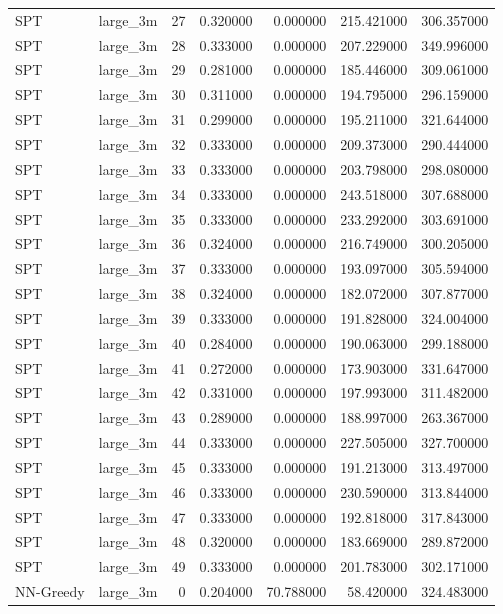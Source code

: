 \begin{tabular}{llrrrrr}
SPT & large_3m & 27 & 0.320000 & 0.000000 & 215.421000 & 306.357000 \\
SPT & large_3m & 28 & 0.333000 & 0.000000 & 207.229000 & 349.996000 \\
SPT & large_3m & 29 & 0.281000 & 0.000000 & 185.446000 & 309.061000 \\
SPT & large_3m & 30 & 0.311000 & 0.000000 & 194.795000 & 296.159000 \\
SPT & large_3m & 31 & 0.299000 & 0.000000 & 195.211000 & 321.644000 \\
SPT & large_3m & 32 & 0.333000 & 0.000000 & 209.373000 & 290.444000 \\
SPT & large_3m & 33 & 0.333000 & 0.000000 & 203.798000 & 298.080000 \\
SPT & large_3m & 34 & 0.333000 & 0.000000 & 243.518000 & 307.688000 \\
SPT & large_3m & 35 & 0.333000 & 0.000000 & 233.292000 & 303.691000 \\
SPT & large_3m & 36 & 0.324000 & 0.000000 & 216.749000 & 300.205000 \\
SPT & large_3m & 37 & 0.333000 & 0.000000 & 193.097000 & 305.594000 \\
SPT & large_3m & 38 & 0.324000 & 0.000000 & 182.072000 & 307.877000 \\
SPT & large_3m & 39 & 0.333000 & 0.000000 & 191.828000 & 324.004000 \\
SPT & large_3m & 40 & 0.284000 & 0.000000 & 190.063000 & 299.188000 \\
SPT & large_3m & 41 & 0.272000 & 0.000000 & 173.903000 & 331.647000 \\
SPT & large_3m & 42 & 0.331000 & 0.000000 & 197.993000 & 311.482000 \\
SPT & large_3m & 43 & 0.289000 & 0.000000 & 188.997000 & 263.367000 \\
SPT & large_3m & 44 & 0.333000 & 0.000000 & 227.505000 & 327.700000 \\
SPT & large_3m & 45 & 0.333000 & 0.000000 & 191.213000 & 313.497000 \\
SPT & large_3m & 46 & 0.333000 & 0.000000 & 230.590000 & 313.844000 \\
SPT & large_3m & 47 & 0.333000 & 0.000000 & 192.818000 & 317.843000 \\
SPT & large_3m & 48 & 0.320000 & 0.000000 & 183.669000 & 289.872000 \\
SPT & large_3m & 49 & 0.333000 & 0.000000 & 201.783000 & 302.171000 \\
NN-Greedy & large_3m & 0 & 0.204000 & 70.788000 & 58.420000 & 324.483000 \\

\end{tabular}
